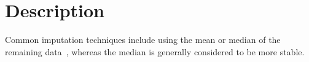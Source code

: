 \section{Description}\label{s:description}

Common imputation techniques include using the mean or median of the remaining data~\cite{Zhang2016-ak}, whereas the
median is generally considered to be more stable.
